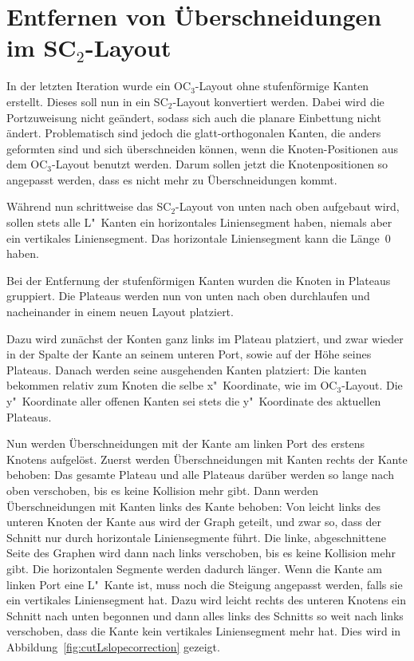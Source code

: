 \documentclass[a4paper]{scrreprt}
\theoremstyle{definition}
\begin{document}
\section{Entfernen von Überschneidungen im SC$_2$-Layout}

In der letzten Iteration wurde ein OC$_3$-Layout ohne stufenförmige Kanten erstellt. Dieses soll nun in ein SC$_2$-Layout konvertiert werden. Dabei wird die Portzuweisung nicht geändert, sodass sich auch die planare Einbettung nicht ändert. Problematisch sind jedoch die glatt-orthogonalen Kanten, die anders geformten sind und sich überschneiden können, wenn die Knoten-Positionen aus dem OC$_3$-Layout benutzt werden. Darum sollen jetzt die Knotenpositionen so angepasst werden, dass es nicht mehr zu Überschneidungen kommt.

Während nun schrittweise das SC$_2$-Layout von unten nach oben aufgebaut wird, sollen stets alle L"~Kanten ein horizontales Liniensegment haben, niemals aber ein vertikales Liniensegment. Das horizontale Liniensegment kann die Länge~0 haben. 


Bei der Entfernung der stufenförmigen Kanten wurden die Knoten in Plateaus gruppiert. Die Plateaus werden nun von unten nach oben durchlaufen und nacheinander in einem neuen Layout platziert.

Dazu wird zunächst der Konten ganz links im Plateau platziert, und zwar wieder in der Spalte der Kante an seinem unteren Port, sowie auf der Höhe seines Plateaus. Danach werden seine ausgehenden Kanten platziert: Die kanten bekommen relativ zum Knoten die selbe x"~Koordinate, wie im OC$_3$-Layout. Die y"~Koordinate aller offenen Kanten sei stets die y"~Koordinate des aktuellen Plateaus. 

Nun werden Überschneidungen mit der Kante am linken Port des erstens Knotens aufgelöst. Zuerst werden Überschneidungen mit Kanten rechts der Kante behoben: Das gesamte Plateau und alle Plateaus darüber werden so lange nach oben verschoben, bis es keine Kollision mehr gibt. Dann werden Überschneidungen mit Kanten links des Kante behoben: Von leicht links des unteren Knoten der Kante aus wird der Graph geteilt, und zwar so, dass der Schnitt nur durch horizontale Liniensegmente führt. Die linke, abgeschnittene Seite des Graphen wird dann nach links verschoben, bis es keine Kollision mehr gibt. Die horizontalen Segmente werden dadurch länger. Wenn die Kante am linken Port eine L"~Kante ist, muss noch die Steigung angepasst werden, falls sie ein vertikales Liniensegment hat. Dazu wird leicht rechts des unteren Knotens ein Schnitt nach unten begonnen und dann alles links des Schnitts so weit nach links verschoben, dass die Kante kein vertikales Liniensegment mehr hat. Dies wird in Abbildung~\ref{fig:cutLslopecorrection} gezeigt.
\end{document}
